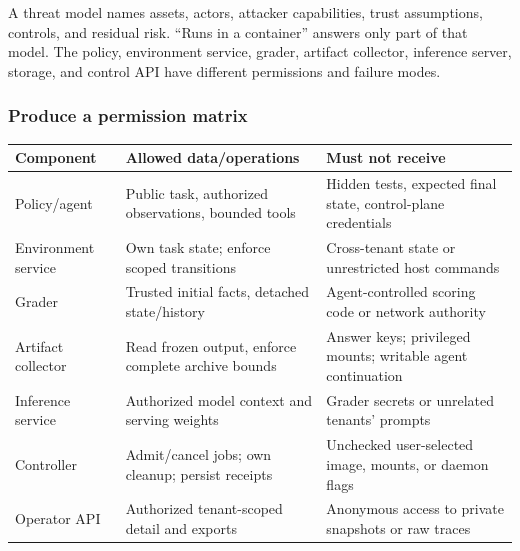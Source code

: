 \documentclass[
  11pt,
  letterpaper,
]{article}
\newcounter{none} %
\begin{document}
A threat model names assets, actors, attacker capabilities, trust
assumptions, controls, and residual risk. ``Runs in a container''
answers only part of that model. The policy, environment service,
grader, artifact collector, inference server, storage, and control API
have different permissions and failure modes.

\subsubsection{Produce a permission
matrix}\label{produce-a-permission-matrix}

{\def\LTcaptype{none} %
\begin{longtable}[]{@{}
  >{\raggedright\arraybackslash}p{}
  >{\raggedright\arraybackslash}p{}
  >{\raggedright\arraybackslash}p{}@{}}
\toprule\noalign{}
\begin{minipage}[b]{\linewidth}\raggedright
Component
\end{minipage} & \begin{minipage}[b]{\linewidth}\raggedright
Allowed data/operations
\end{minipage} & \begin{minipage}[b]{\linewidth}\raggedright
Must not receive
\end{minipage} \\
\midrule\noalign{}
\endhead
\bottomrule\noalign{}
\endlastfoot
Policy/agent & Public task, authorized observations, bounded tools &
Hidden tests, expected final state, control-plane credentials \\
Environment service & Own task state; enforce scoped transitions &
Cross-tenant state or unrestricted host commands \\
Grader & Trusted initial facts, detached state/history &
Agent-controlled scoring code or network authority \\
Artifact collector & Read frozen output, enforce complete archive bounds
& Answer keys; privileged mounts; writable agent continuation \\
Inference service & Authorized model context and serving weights &
Grader secrets or unrelated tenants' prompts \\
Controller & Admit/cancel jobs; own cleanup; persist receipts &
Unchecked user-selected image, mounts, or daemon flags \\
Operator API & Authorized tenant-scoped detail and exports & Anonymous
access to private snapshots or raw traces \\
\end{longtable}
}
\end{document}
